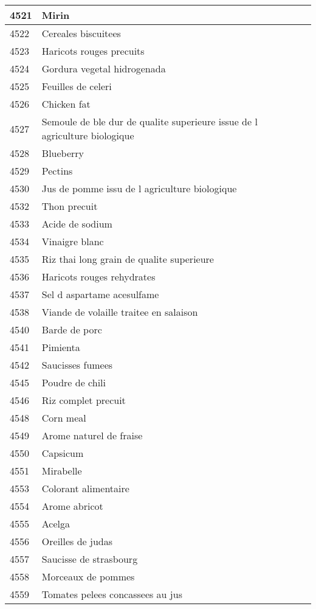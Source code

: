 \begin{longtable}{|l|l|}
4521 & Mirin \\ \hline 
4522 & Cereales biscuitees \\ \hline 
4523 & Haricots rouges precuits \\ \hline 
4524 & Gordura vegetal hidrogenada \\ \hline 
4525 & Feuilles de celeri \\ \hline 
4526 & Chicken fat \\ \hline 
4527 & Semoule de ble dur de qualite superieure issue de l agriculture biologique \\ \hline 
4528 & Blueberry \\ \hline 
4529 & Pectins \\ \hline 
4530 & Jus de pomme issu de l agriculture biologique \\ \hline 
4532 & Thon precuit \\ \hline 
4533 & Acide de sodium \\ \hline 
4534 & Vinaigre blanc \\ \hline 
4535 & Riz thai long grain de qualite superieure \\ \hline 
4536 & Haricots rouges rehydrates \\ \hline 
4537 & Sel d aspartame acesulfame \\ \hline 
4538 & Viande de volaille traitee en salaison \\ \hline 
4540 & Barde de porc \\ \hline 
4541 & Pimienta \\ \hline 
4542 & Saucisses fumees \\ \hline 
4545 & Poudre de chili \\ \hline 
4546 & Riz complet precuit \\ \hline 
4548 & Corn meal \\ \hline 
4549 & Arome naturel de fraise \\ \hline 
4550 & Capsicum \\ \hline 
4551 & Mirabelle \\ \hline 
4553 & Colorant alimentaire \\ \hline 
4554 & Arome abricot \\ \hline 
4555 & Acelga \\ \hline 
4556 & Oreilles de judas \\ \hline 
4557 & Saucisse de strasbourg \\ \hline 
4558 & Morceaux de pommes \\ \hline 
4559 & Tomates pelees concassees au jus \\ \hline 

\end{longtable}
